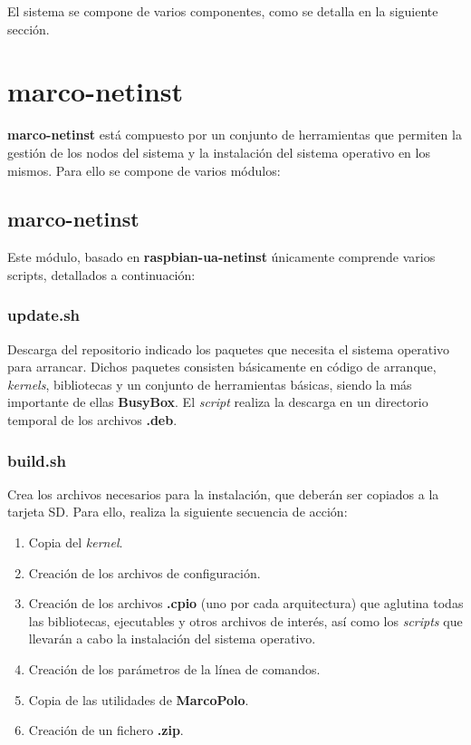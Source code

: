 \documentclass{article}
\begin{document}
El sistema se compone de varios componentes, como se detalla en la siguiente sección.

\section{marco-netinst}

\textbf{marco-netinst} está compuesto por un conjunto de herramientas que permiten la gestión de los nodos del sistema y la instalación del sistema operativo en los mismos. Para ello se compone de varios módulos:

\subsection{marco-netinst}

Este módulo, basado en \textbf{raspbian-ua-netinst} únicamente comprende varios scripts, detallados a continuación:

\subsubsection*{update.sh}

Descarga del repositorio indicado los paquetes que necesita el sistema operativo para arrancar. Dichos paquetes consisten básicamente en código de arranque, \textit{kernels}, bibliotecas y un conjunto de herramientas básicas, siendo la más importante de ellas \textbf{BusyBox}. El \textit{script} realiza la descarga en un directorio temporal de los archivos \textbf{.deb}.

\subsubsection*{build.sh}

Crea los archivos necesarios para la instalación, que deberán ser copiados a la tarjeta SD. Para ello, realiza la siguiente secuencia de acción:

\begin{enumerate}
\item Copia del \textit{kernel}.
\item Creación de los archivos de configuración.
\item Creación de los archivos \textbf{.cpio} (uno por cada arquitectura) que aglutina todas las bibliotecas, ejecutables y otros archivos de interés, así como los \textit{scripts} que llevarán a cabo la instalación del sistema operativo. 
\item Creación de los parámetros de la línea de comandos.
\item Copia de las utilidades de \textbf{MarcoPolo}.
\item Creación de un fichero \textbf{.zip}.
\end{enumerate}
\end{document}
